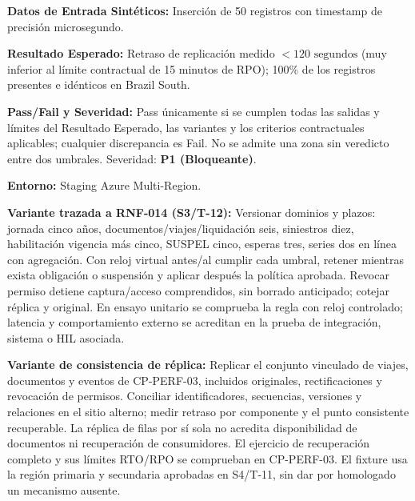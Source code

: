 \par\noindent \textbf{Datos de Entrada Sintéticos:} Inserción de 50 registros con timestamp de precisión microsegundo.\par
\par\noindent \textbf{Resultado Esperado:} Retraso de replicación medido $< 120\text{ segundos}$ (muy inferior al límite contractual de 15 minutos de RPO); 100\% de los registros presentes e idénticos en Brazil South.\par
\par\noindent \textbf{Pass/Fail y Severidad:} Pass únicamente si se cumplen todas las salidas y límites del Resultado Esperado, las variantes y los criterios contractuales aplicables; cualquier discrepancia es Fail. No se admite una zona sin veredicto entre dos umbrales. Severidad: \textbf{P1 (Bloqueante)}.\par
\par\noindent \textbf{Entorno:} Staging Azure Multi-Region.\par

\par\noindent \textbf{Variante trazada a RNF-014 (S3/T-12):} Versionar dominios y plazos: jornada cinco años, documentos/viajes/liquidación seis, siniestros diez, habilitación vigencia más cinco, SUSPEL cinco, esperas tres, series dos en línea con agregación. Con reloj virtual antes/al cumplir cada umbral, retener mientras exista obligación o suspensión y aplicar después la política aprobada. Revocar permiso detiene captura/acceso comprendidos, sin borrado anticipado; cotejar réplica y original. En ensayo unitario se comprueba la regla con reloj controlado; latencia y comportamiento externo se acreditan en la prueba de integración, sistema o HIL asociada.\par


\par\noindent\textbf{Variante de consistencia de réplica:} Replicar el conjunto vinculado de viajes, documentos y eventos de CP-PERF-03, incluidos originales, rectificaciones y revocación de permisos. Conciliar identificadores, secuencias, versiones y relaciones en el sitio alterno; medir retraso por componente y el punto consistente recuperable. La réplica de filas por sí sola no acredita disponibilidad de documentos ni recuperación de consumidores. El ejercicio de recuperación completo y sus límites RTO/RPO se comprueban en CP-PERF-03. El fixture usa la región primaria y secundaria aprobadas en S4/T-11, sin dar por homologado un mecanismo ausente.\par

